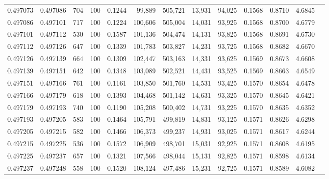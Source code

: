 \begin{tabular}{rrrrrrrrrrrrr}
0.497073 & 0.497086 &   704 & 100 &                                     0.1244 &  99,889 & 505,721 &  13,931 &  94,025 & 0.1568 & 0.8710 & 4.6845 \\
0.497086 & 0.497101 &   717 & 100 &                                     0.1224 & 100,606 & 505,004 &  14,031 &  93,925 & 0.1568 & 0.8700 & 4.6779 \\
0.497101 & 0.497112 &   530 & 100 &                                     0.1587 & 101,136 & 504,474 &  14,131 &  93,825 & 0.1568 & 0.8691 & 4.6730 \\
0.497112 & 0.497126 &   647 & 100 &                                     0.1339 & 101,783 & 503,827 &  14,231 &  93,725 & 0.1568 & 0.8682 & 4.6670 \\
0.497126 & 0.497139 &   664 & 100 &                                     0.1309 & 102,447 & 503,163 &  14,331 &  93,625 & 0.1569 & 0.8673 & 4.6608 \\
0.497139 & 0.497151 &   642 & 100 &                                     0.1348 & 103,089 & 502,521 &  14,431 &  93,525 & 0.1569 & 0.8663 & 4.6549 \\
0.497151 & 0.497166 &   761 & 100 &                                     0.1161 & 103,850 & 501,760 &  14,531 &  93,425 & 0.1570 & 0.8654 & 4.6478 \\
0.497166 & 0.497179 &   618 & 100 &                                     0.1393 & 104,468 & 501,142 &  14,631 &  93,325 & 0.1570 & 0.8645 & 4.6421 \\
0.497179 & 0.497193 &   740 & 100 &                                     0.1190 & 105,208 & 500,402 &  14,731 &  93,225 & 0.1570 & 0.8635 & 4.6352 \\
0.497193 & 0.497205 &   583 & 100 &                                     0.1464 & 105,791 & 499,819 &  14,831 &  93,125 & 0.1571 & 0.8626 & 4.6298 \\
0.497205 & 0.497215 &   582 & 100 &                                     0.1466 & 106,373 & 499,237 &  14,931 &  93,025 & 0.1571 & 0.8617 & 4.6244 \\
0.497215 & 0.497225 &   536 & 100 &                                     0.1572 & 106,909 & 498,701 &  15,031 &  92,925 & 0.1571 & 0.8608 & 4.6195 \\
0.497225 & 0.497237 &   657 & 100 &                                     0.1321 & 107,566 & 498,044 &  15,131 &  92,825 & 0.1571 & 0.8598 & 4.6134 \\
0.497237 & 0.497248 &   558 & 100 &                                     0.1520 & 108,124 & 497,486 &  15,231 &  92,725 & 0.1571 & 0.8589 & 4.6082 \\

\end{tabular}
